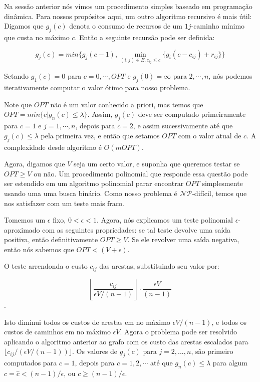 \documentclass[10pt,a4paper]{article}
\begin{document}
Na sessão anterior nós vimos um procedimento simples baseado em 
programação dinâmica. Para nossos propósitos aqui, um outro algoritmo 
recursivo é mais útil:
Digamos que $g_j(c)$ denota o consumo de recursos de um $1j$-caminho 
mínimo que custa no máximo $c$. Então a seguinte recursão pode ser 
definida:

$$ g_j(c) = min\{
g_j(c - 1), \displaystyle\min_{(i,j) \in E, c_{ij} \le c}\{g_i(c - 
c_{ij}) + r_{ij}\}
\} $$

Setando $g_1(c) = 0$ para $c = 0, \cdots, OPT$ e $g_j(0) = \infty$ para 
$2, \cdots, n$, nós podemos iterativamente computar o valor ótimo para 
nosso problema.

Note que $OPT$ não é um valor conhecido a priori, mas temos que $OPT = 
min \{c | g_n(c) \le \lambda\}$. Assim, $g_j(c)$ deve ser computado 
primeiramente para $c=1$ e $j=1,\cdots,n$, depois para $c=2$, e assim 
sucessivamente até que $g_j(c) \le \lambda$ pela primeira vez, e então 
que setamos $OPT$ com o valor atual de $c$. A complexidade desde 
algoritmo é $O(m OPT)$.

Agora, digamos que $V$ seja um certo valor, e suponha que queremos 
testar se $OPT \ge V$ ou não. Um procedimento polinomial que responde 
essa questão pode ser estendido em um algoritmo polinomial parar 
encontrar $OPT$ simplesmente usando uma uma busca binário. Como nosso 
problema é $\mathcal{NP}$-difícil, temos que nos satisfazer com um teste 
mais fraco.

Tomemos um $\epsilon$ fixo, $0 < \epsilon < 1$. Agora, nós explicamos um 
teste polinomial $\epsilon$-aproximado com as seguintes propriedades: se 
tal teste devolve uma saída positiva, então definitivamente $OPT \ge V$.  
Se ele revolver uma saída negativa, então nós sabemos que $OPT < (V + 
\epsilon)$.

O teste arrendonda o custo $c_{ij}$ das arestas, substituindo seu valor 
por:

$$ \left\lfloor \frac{ c_{ij} }{ \epsilon V / (n-1) } \right\rfloor 
\cdot \frac{\epsilon V}{(n-1)} $$.

Isto diminui todos os custos de arestas em no máximo $\epsilon V / 
(n-1)$, e todos os custos de caminhos em no máximo $\epsilon V$. Agora o 
problema pode ser resolvido aplicando o algoritmo anterior ao grafo com 
os custo das arestas escalados para $\lfloor c_{ij} / (\epsilon V / 
(n-1)) \rfloor$. Os valores de $g_j(c)$ para $j = 2, ..., n$, são 
primeiro computados para $c=1$, depois para $c=1,2,\cdots$ até que
$g_n(c) \le \lambda$ para algum $c=\hat{c}<(n-1)/\epsilon$, ou $c \ge 
(n-1)/\epsilon$.
\end{document}
